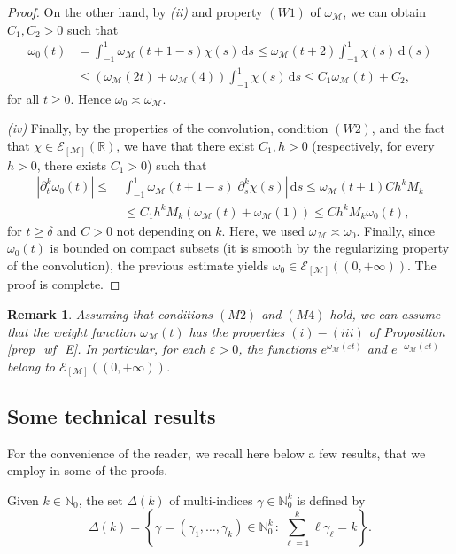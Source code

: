 \documentclass[11pt,reqno]{amsart}
\numberwithin{equation}{section}
\newtheorem{remark}[theorem]{Remark}
\newcommand{\R}{{\mathbb{R}}} %
\newcommand{\N}{{\mathbb{N}}} %
\newcommand{\E}{{\mathcal{E}}}
\newcommand{\M}{{\mathcal{M}}} %
\begin{document}
\begin{proof}
	On the other hand, by \textit{(ii)} and property $(W1)$ of $\omega_\M$, we can obtain $C_1,C_2>0$ such that
	\begin{align*}
		\omega_0(t) & = \int_{-1}^1 \omega_\M(t+1-s)\chi(s)\,\mathrm{d}s
		\leq \omega_\M(t+2)\int_{-1}^1\chi(s)\,\mathrm{d}(s)\\
		& \leq \left(\omega_\M(2t)+\omega_\M(4)\right)\int_{-1}^1 \chi(s)\,\mathrm{d}s
		\leq C_1\omega_\M(t)+C_2,
	\end{align*}
	for all $t\geq 0$. Hence $\omega_0\asymp \omega_\M$.
	
	
	\noindent\textit{(iv)} Finally, by the properties of the convolution, condition $(W2)$, and the fact that $\chi\in\E_{[\M]}(\R)$, we have that there exist $C_1,h>0$ (respectively, for every $h>0$, there exists $C_1>0$) such that
	\begin{align*}
		|\partial_t^k\omega_0(t)|\leq\ & \int_{-1}^1 \omega_\M(t+1-s)|\partial_s^k\chi(s)|\,\mathrm{d}s
		\leq \omega_\M(t+1)Ch^kM_k\\
		& \leq C_1h^{k}M_k(\omega_\M(t)+\omega_\M(1))
		\leq Ch^kM_k \omega_0(t),
	\end{align*}
	for $t\geq\delta$ and $C>0$ not depending on $k$. Here, we used $\omega_\M\asymp\omega_0$. Finally, since $\omega_0(t)$ is bounded on compact subsets (it is smooth by the regularizing property of the convolution), the previous estimate yields $\omega_0\in\E_{[\M]}((0,+\infty))$. The proof is complete.	
\end{proof}

\begin{remark}
	Assuming that conditions $(M2)$ and $(M4)$ hold, we can assume that the weight function $\omega_\M(t)$ has the properties $(i)-(iii)$ of Proposition \ref{prop_wf_E}. In particular, for each $\varepsilon>0$, the functions $e^{\omega_\M(\varepsilon t)}$ and $e^{-\omega_\M(\varepsilon t)}$ belong to $\E_{[\M]}((0,+\infty))$.
\end{remark}

\subsection{Some technical results}\label{sec:app}
For the convenience of the reader, we recall here below a few results,
that we employ in some of the proofs.

Given $k\in\N_0$, the set $\Delta(k)$ of multi-indices 
$\gamma\in \mathbb{N}_0^k $ is defined by
%
\begin{equation}\label{Delta_k}
	\Delta(k) = \left\{\gamma=(\gamma_1,\dots,\gamma_k)\in\mathbb{N}_0^k \, : \, \sum_{\ell=1}^{k}\ell\gamma_\ell=k\right\}.
\end{equation}
\end{document}
